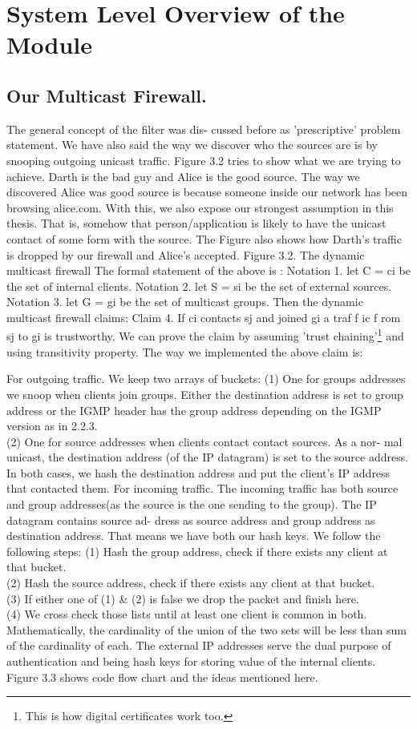 \documentclass[11pt,left=2cm,bottom=2cm,oneside]{book}
\begin{document}
\section{System Level Overview of the Module}
\subsection{Our Multicast Firewall.} The general concept of the filter was dis-
cussed before as 'prescriptive' problem statement. We have also said the way we
discover who the sources are is by snooping outgoing unicast traffic. Figure 3.2 tries
to show what we are trying to achieve. Darth is the bad guy and Alice is the good
source. The way we discovered Alice was good source is because someone inside
our network has been browsing alice.com. With this, we also expose our strongest
assumption in this thesis. That is, somehow that person/application is likely to
have the unicast contact of some form with the source. The Figure also shows how
Darth's traffic is dropped by our firewall and Alice's accepted.
Figure 3.2. The dynamic multicast firewall
The formal statement of the above is :
Notation 1. let C = {ci } be the set of internal clients.
Notation 2. let S = {si } be the set of external sources.
Notation 3. let G = {gi } be the set of multicast groups.
Then the dynamic multicast firewall claims:
Claim 4. If ci contacts sj and joined gi a traf f ic f rom sj to gi is trustworthy.
We can prove the claim by assuming 'trust chaining'\footnote{This is how digital certificates work too.} and using transitivity
property.
The way we implemented the above claim is:

For outgoing traffic. We keep two arrays of buckets:
(1) One for groups addresses we snoop when clients join groups. Either the
destination address is set to group address or the IGMP header has the
group address depending on the IGMP version as in 2.2.3.\\
(2) One for source addresses when clients contact contact sources. As a nor-
mal unicast, the destination address (of the IP datagram) is set to the
source address.\\
In both cases, we hash the destination address and put the client's IP address that
contacted them.
For incoming traffic. The incoming traffic has both source and group addresses(as
the source is the one sending to the group). The IP datagram contains source ad-
dress as source address and group address as destination address. That means we
have both our hash keys. We follow the following steps:
(1) Hash the group address, check if there exists any client at that bucket.\\
(2) Hash the source address, check if there exists any client at that bucket.\\
(3) If either one of (1) \& (2) is false we drop the packet and finish here.\\
(4) We cross check those lists until at least one client is common in both.\\
Mathematically, the cardinality of the union of the two sets will be less
than sum of the cardinality of each.
The external IP addresses serve the dual purpose of authentication and being hash
keys for storing value of the internal clients.
Figure 3.3 shows code flow chart and the ideas mentioned here.
\end{document}
